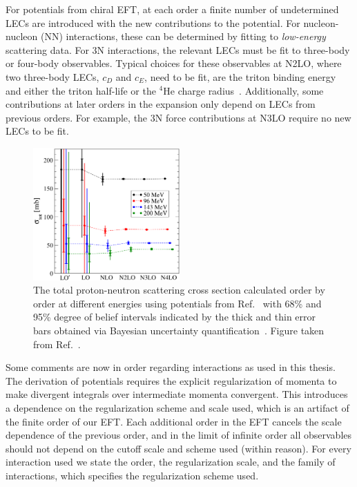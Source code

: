 For potentials from chiral EFT,
at each order a finite number of undetermined LECs are introduced with the new contributions to the potential.
For nucleon-nucleon (NN) interactions, these can be determined by fitting to \textit{low-energy} scattering data.
For 3N interactions, the relevant LECs must be fit to three-body or four-body observables.
Typical choices for these observables at N2LO, where two three-body LECs, $c_D$ and $c_E$, need to be fit,
are the triton binding energy and either the triton half-life or the ${}^4\text{He}$ charge radius~\cite{Hebe20habi}.
Additionally, some contributions at later orders in the expansion only depend on LECs from previous orders.
For example, the 3N force contributions at N3LO require no new LECs to be fit.

\begin{figure}[t!]
  \centering
    \includegraphics[width=0.5\textwidth]{proposal/doc/images/external/EKM_Tlab_together_setA_eps_approx0.pdf}
  \caption[
    The total proton-neutron scattering cross section
    calculated order by order at different energies
    using chiral potentials
    with 68\% and 95\% degree of belief intervals
    indicated by the thick and thin error bars
    obtained via Bayesian uncertainty quantification.
  ]{
    The total proton-neutron scattering cross section
    calculated order by order at different energies
    using potentials from Ref.~\cite{Epel14ekm2}
    with 68\% and 95\% degree of belief intervals
    indicated by the thick and thin error bars
    obtained via Bayesian uncertainty quantification~\cite{Furn15bayesuq}.
    Figure taken from Ref.~\cite{Furn15bayesuq}.
  }\label{fig:chieft_uq}
\end{figure}

Some comments are now in order regarding interactions as used in this thesis.
The derivation of potentials requires the explicit regularization of momenta
to make divergent integrals over intermediate momenta convergent.
This introduces a dependence on the regularization scheme and scale used,
which is an artifact of the finite order of our EFT.\@
Each additional order in the EFT cancels the scale dependence of the previous order,
and in the limit of infinite order all observables
should not depend on the cutoff scale and scheme used (within reason).
For every interaction used we state the order, the regularization scale,
and the family of interactions, which specifies the regularization scheme used.

